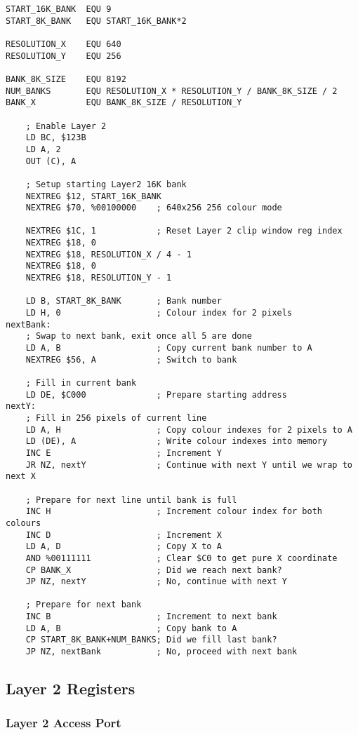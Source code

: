 \documentclass[12pt,twoside,openright,a4paper]{book}
\begin{document}
\begin{lstlisting}
START_16K_BANK  EQU 9
START_8K_BANK   EQU START_16K_BANK*2

RESOLUTION_X    EQU 640
RESOLUTION_Y    EQU 256

BANK_8K_SIZE    EQU 8192
NUM_BANKS       EQU RESOLUTION_X * RESOLUTION_Y / BANK_8K_SIZE / 2
BANK_X          EQU BANK_8K_SIZE / RESOLUTION_Y

	; Enable Layer 2
	LD BC, $123B
	LD A, 2
	OUT (C), A

	; Setup starting Layer2 16K bank
	NEXTREG $12, START_16K_BANK
	NEXTREG $70, %00100000    ; 640x256 256 colour mode

	NEXTREG $1C, 1            ; Reset Layer 2 clip window reg index
	NEXTREG $18, 0
	NEXTREG $18, RESOLUTION_X / 4 - 1
	NEXTREG $18, 0
	NEXTREG $18, RESOLUTION_Y - 1

	LD B, START_8K_BANK       ; Bank number
	LD H, 0                   ; Colour index for 2 pixels
nextBank:
	; Swap to next bank, exit once all 5 are done
	LD A, B                   ; Copy current bank number to A
	NEXTREG $56, A            ; Switch to bank

	; Fill in current bank
	LD DE, $C000              ; Prepare starting address
nextY:
	; Fill in 256 pixels of current line
	LD A, H                   ; Copy colour indexes for 2 pixels to A
	LD (DE), A                ; Write colour indexes into memory
	INC E                     ; Increment Y
	JR NZ, nextY              ; Continue with next Y until we wrap to next X

	; Prepare for next line until bank is full
	INC H                     ; Increment colour index for both colours
	INC D                     ; Increment X
	LD A, D                   ; Copy X to A
	AND %00111111             ; Clear $C0 to get pure X coordinate
	CP BANK_X                 ; Did we reach next bank?
	JP NZ, nextY              ; No, continue with next Y

	; Prepare for next bank
	INC B                     ; Increment to next bank
	LD A, B                   ; Copy bank to A
	CP START_8K_BANK+NUM_BANKS; Did we fill last bank?
	JP NZ, nextBank           ; No, proceed with next bank
\end{lstlisting}


\subsection{Layer 2 Registers}
\label{zx_next_layer2_registers}

\subsubsection{Layer 2 Access Port }
\end{document}
